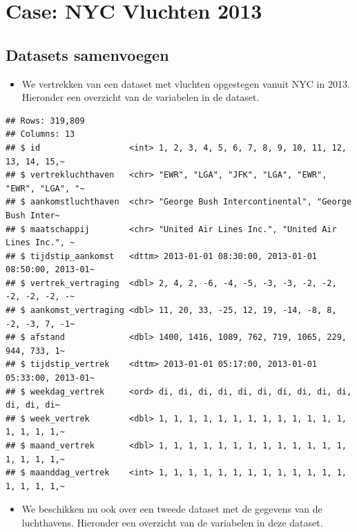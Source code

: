 \documentclass[]{tufte-book}
\providecommand{\tightlist}{%
  \setlength{\itemsep}{0pt}\setlength{\parskip}{0pt}}
\begin{document}
\hypertarget{case-nyc-vluchten-2013}{%
\section{Case: NYC Vluchten 2013}\label{case-nyc-vluchten-2013}}

\hypertarget{datasets-samenvoegen}{%
\subsection{Datasets samenvoegen}\label{datasets-samenvoegen}}

\begin{itemize}
\tightlist
\item
  We vertrekken van een dataset met vluchten opgestegen vanuit NYC in 2013. Hieronder een overzicht van de variabelen in de dataset.
\end{itemize}

\begin{verbatim}
## Rows: 319,809
## Columns: 13
## $ id                  <int> 1, 2, 3, 4, 5, 6, 7, 8, 9, 10, 11, 12, 13, 14, 15,~
## $ vertrekluchthaven   <chr> "EWR", "LGA", "JFK", "LGA", "EWR", "EWR", "LGA", "~
## $ aankomstluchthaven  <chr> "George Bush Intercontinental", "George Bush Inter~
## $ maatschappij        <chr> "United Air Lines Inc.", "United Air Lines Inc.", ~
## $ tijdstip_aankomst   <dttm> 2013-01-01 08:30:00, 2013-01-01 08:50:00, 2013-01~
## $ vertrek_vertraging  <dbl> 2, 4, 2, -6, -4, -5, -3, -3, -2, -2, -2, -2, -2, -~
## $ aankomst_vertraging <dbl> 11, 20, 33, -25, 12, 19, -14, -8, 8, -2, -3, 7, -1~
## $ afstand             <dbl> 1400, 1416, 1089, 762, 719, 1065, 229, 944, 733, 1~
## $ tijdstip_vertrek    <dttm> 2013-01-01 05:17:00, 2013-01-01 05:33:00, 2013-01~
## $ weekdag_vertrek     <ord> di, di, di, di, di, di, di, di, di, di, di, di, di~
## $ week_vertrek        <dbl> 1, 1, 1, 1, 1, 1, 1, 1, 1, 1, 1, 1, 1, 1, 1, 1, 1,~
## $ maand_vertrek       <dbl> 1, 1, 1, 1, 1, 1, 1, 1, 1, 1, 1, 1, 1, 1, 1, 1, 1,~
## $ maanddag_vertrek    <int> 1, 1, 1, 1, 1, 1, 1, 1, 1, 1, 1, 1, 1, 1, 1, 1, 1,~
\end{verbatim}

\begin{itemize}
\tightlist
\item
  We beschikken nu ook over een tweede dataset met de gegevens van de luchthavens. Hieronder een overzicht van de variabelen in deze dataset.
\end{itemize}
\end{document}
